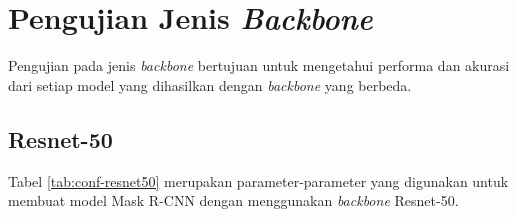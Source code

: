 \section{Pengujian Jenis \textit{Backbone}}
\label{sec:pengujian-backbone}

Pengujian pada jenis \textit{backbone} bertujuan untuk mengetahui performa dan akurasi dari setiap model yang dihasilkan dengan \textit{backbone} yang berbeda.

\subsection{Resnet-50}
\label{subsec:resnet50}

Tabel \ref{tab:conf-resnet50} merupakan parameter-parameter yang digunakan untuk membuat model Mask R-CNN dengan menggunakan \textit{backbone} Resnet-50.


